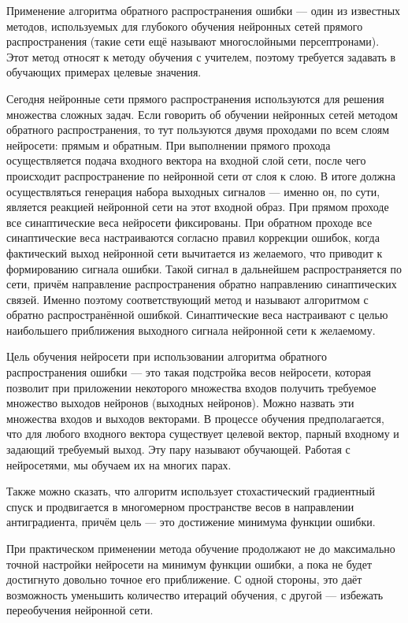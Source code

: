 Применение алгоритма обратного распространения ошибки — один из известных методов, используемых для глубокого обучения
нейронных сетей прямого распространения (такие сети ещё называют многослойными персептронами). Этот метод относят к
методу обучения с учителем, поэтому требуется задавать в обучающих примерах целевые значения.

Сегодня нейронные сети прямого распространения используются для решения множества сложных задач. Если говорить об
обучении нейронных сетей методом обратного распространения, то тут пользуются двумя проходами по всем слоям нейросети:
прямым и обратным. При выполнении прямого прохода осуществляется подача входного вектора на входной слой сети, после
чего происходит распространение по нейронной сети от слоя к слою. В итоге должна осуществляться генерация набора
выходных сигналов — именно он, по сути, является реакцией нейронной сети на этот входной образ. При прямом проходе все
синаптические веса нейросети фиксированы. При обратном проходе все синаптические веса настраиваются согласно правил
коррекции ошибок, когда фактический выход нейронной сети вычитается из желаемого, что приводит к формированию сигнала
ошибки. Такой сигнал в дальнейшем распространяется по сети, причём направление распространения обратно направлению
синаптических связей. Именно поэтому соответствующий метод и называют алгоритмом с обратно распространённой ошибкой.
Синаптические веса настраивают с целью наибольшего приближения выходного сигнала нейронной сети к желаемому.

Цель обучения нейросети при использовании алгоритма обратного распространения ошибки — это такая подстройка весов
нейросети, которая позволит при приложении некоторого множества входов получить требуемое множество выходов нейронов
(выходных нейронов). Можно назвать эти множества входов и выходов векторами. В процессе обучения предполагается,
что для любого входного вектора существует целевой вектор, парный входному и задающий требуемый выход. Эту пару
называют обучающей. Работая с нейросетями, мы обучаем их на многих парах.

Также можно сказать, что алгоритм использует стохастический градиентный спуск и продвигается в многомерном пространстве
весов в направлении антиградиента, причём цель — это достижение минимума функции ошибки.

При практическом применении метода обучение продолжают не до \linebreak максимально точной настройки нейросети на минимум функции
ошибки, а пока не будет достигнуто довольно точное его приближение. С одной стороны, это даёт возможность уменьшить
количество итераций обучения, с другой — избежать переобучения нейронной сети.

